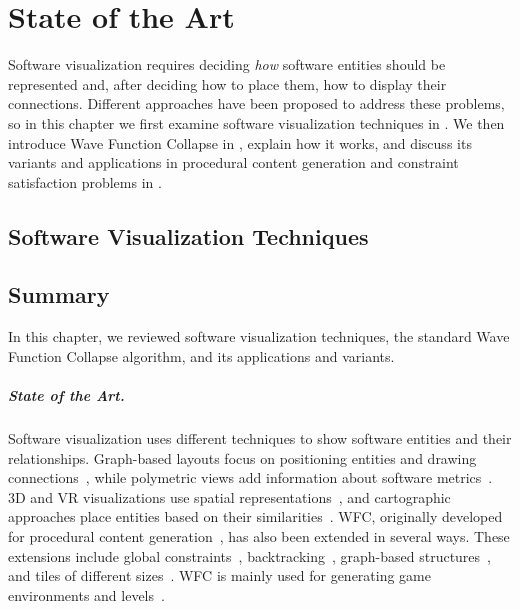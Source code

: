 \documentclass[../../main.tex]{subfiles}
\begin{document}
\chapter{State of the Art} 
\label{chap:SOA}
Software visualization requires deciding \emph{how} software entities should be represented and, after deciding how to place them, how to display their connections. Different approaches have been proposed to address these problems, so in this chapter we first examine software visualization techniques in . We then introduce Wave Function Collapse in , explain how it works, and discuss its variants and applications in procedural content generation and constraint satisfaction problems in .

\section{Software Visualization Techniques}
\label{sec:soa_soft_vis} 









\section{Summary}

In this chapter, we reviewed software visualization techniques, the standard Wave Function Collapse algorithm, and its applications and variants.

\paragraph{State of the Art.}
Software visualization uses different techniques to show software entities and their relationships. Graph-based layouts focus on positioning entities and drawing connections~, while polymetric views add information about software metrics~. 3D and VR visualizations use spatial representations~, and cartographic approaches place entities based on their similarities~. WFC, originally developed for procedural content generation~, has also been extended in several ways. These extensions include global constraints~, backtracking~, graph-based structures~, and tiles of different sizes~. WFC is mainly used for generating game environments and levels~.
\end{document}
